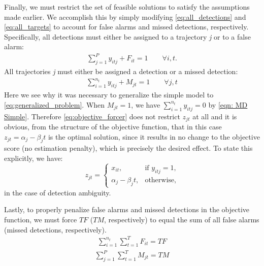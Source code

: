 Finally, we must restrict the set of feasible solutions to satisfy the assumptions made earlier. We accomplish this by simply modifying \eqref{eq:all_detections} and \eqref{eq:all_targets} to account for false alarms and missed detections, respectively. Specifically, all detections must either be assigned to a trajectory \textit{j} or to a false alarm:
\begin{align}\label{eqn: FA Simple}
\sum_{j=1}^{P} y_{itj} + F_{it} = 1 \qquad \forall i,t.
\end{align}
All trajectories \textit{j} must either be assigned a detection or a missed detection:
\begin{align}\label{eqn: MD Simple}
\sum_{i=1}^{n_{t}} y_{itj} + M_{jt} = 1 \qquad \forall j,t
\end{align}
Here we see why it was necessary to generalize the simple model to \eqref{eq:generalized_problem}. When $M_{jt} = 1$, we have $\sum_{i=1}^{n_t} y_{itj} = 0$ by \eqref{eqn: MD Simple}. Therefore \eqref{eq:objective_forcer} does not restrict $z_{jt}$ at all and it is obvious, from the structure of the objective function, that in this case $z_{jt}=\alpha_{j} - \beta_{j}t$ is the optimal solution, since it results in no change to the objective score (no estimation penalty), which is precisely the desired effect. To state this explicitly, we have: 
\[z_{jt} =
\begin{cases}
x_{it}, & \text{if $y_{itj} = 1$,} \\
\alpha_{j} - \beta_{j}t, & \text{otherwise,}
\end{cases}\]
in the case of detection ambiguity. 

Lastly, to properly penalize false alarms and missed detections in the objective function, we must force $TF$ ($TM$, respectively) to equal the sum of all false alarms (missed detections, respectively).
\begin{align*}
\sum_{i=1}^{n_{t}} \sum_{t=1}^{T} F_{it} = TF
\end{align*}
\begin{align}\label{eqn: MD Total}
\sum_{j=1}^{P} \sum_{t=1}^{T} M_{jt} = TM 
\end{align}

